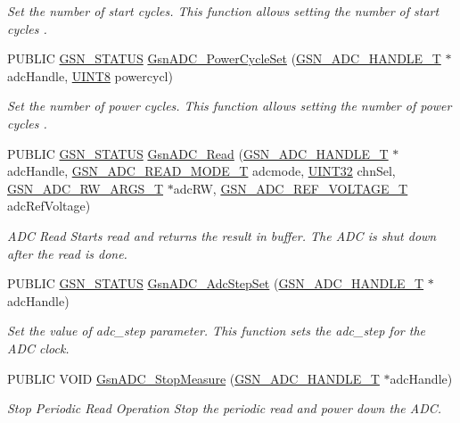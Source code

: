 \begin{DoxyCompactItemize}
\begin{DoxyCompactList}\small\item\em Set the number of start cycles. This function allows setting the number of start cycles . \end{DoxyCompactList}\item 
PUBLIC \hyperlink{a00660_gada5951904ac6110b1fa95e51a9ddc217}{GSN\_\-STATUS} \hyperlink{a00643_gaee01f7aa2010bd9a4e5f9d8bc7f3bea4}{GsnADC\_\-PowerCycleSet} (\hyperlink{a00024}{GSN\_\-ADC\_\-HANDLE\_\-T} $\ast$adcHandle, \hyperlink{a00660_gab27e9918b538ce9d8ca692479b375b6a}{UINT8} powercycl)
\begin{DoxyCompactList}\small\item\em Set the number of power cycles. This function allows setting the number of power cycles . \end{DoxyCompactList}\item 
PUBLIC \hyperlink{a00660_gada5951904ac6110b1fa95e51a9ddc217}{GSN\_\-STATUS} \hyperlink{a00643_gadf20d396265cb22adb23ae34d3bc9701}{GsnADC\_\-Read} (\hyperlink{a00024}{GSN\_\-ADC\_\-HANDLE\_\-T} $\ast$adcHandle, \hyperlink{a00643_ga67df3ab0d6b619d585d941ad1f3f0233}{GSN\_\-ADC\_\-READ\_\-MODE\_\-T} adcmode, \hyperlink{a00660_gae1e6edbbc26d6fbc71a90190d0266018}{UINT32} chnSel, \hyperlink{a00025}{GSN\_\-ADC\_\-RW\_\-ARGS\_\-T} $\ast$adcRW, \hyperlink{a00643_ga560e320e7f3b88d78bb8d8766a8c7445}{GSN\_\-ADC\_\-REF\_\-VOLTAGE\_\-T} adcRefVoltage)
\begin{DoxyCompactList}\small\item\em ADC Read Starts read and returns the result in buffer. The ADC is shut down after the read is done. \end{DoxyCompactList}\item 
PUBLIC \hyperlink{a00660_gada5951904ac6110b1fa95e51a9ddc217}{GSN\_\-STATUS} \hyperlink{a00643_ga9924b69851adbdeef7d743825fe30c7a}{GsnADC\_\-AdcStepSet} (\hyperlink{a00024}{GSN\_\-ADC\_\-HANDLE\_\-T} $\ast$adcHandle)
\begin{DoxyCompactList}\small\item\em Set the value of adc\_\-step parameter. This function sets the adc\_\-step for the ADC clock. \end{DoxyCompactList}\item 
PUBLIC VOID \hyperlink{a00643_gad9bcae203930867c8bbae3d9a007764b}{GsnADC\_\-StopMeasure} (\hyperlink{a00024}{GSN\_\-ADC\_\-HANDLE\_\-T} $\ast$adcHandle)
\begin{DoxyCompactList}\small\item\em Stop Periodic Read Operation Stop the periodic read and power down the ADC. \end{DoxyCompactList}\item 

\end{DoxyCompactItemize}

